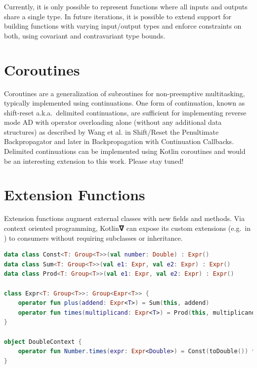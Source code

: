 \documentclass[12pt,initial,twoside,maitrise]{dms}
\numberwithin{equation}{section}
\numberwithin{table}{chapter}
\numberwithin{figure}{chapter}
\begin{document}
Currently, it is only possible to represent functions where all inputs and outputs share a single type. In future iterations, it is possible to extend support for building functions with varying input/output types and enforce constraints on both, using covariant and contravariant type bounds.

\section{Coroutines}

Coroutines are a generalization of subroutines for non-preemptive multitasking, typically implemented using continuations. One form of continuation, known as shift-reset a.k.a.\ delimited continuations, are sufficient for implementing reverse mode AD with operator overloading alone (without any additional data structures) as described by Wang et al. in Shift/Reset the Penultimate Backpropagator\cite{wang2018demystifying} and later in Backpropagation with Continuation Callbacks\cite{wang2018backpropagation}. Delimited continuations can be implemented using Kotlin coroutines and would be an interesting extension to this work. Please stay tuned!

\section{Extension Functions}

Extension functions augment external classes with new fields and methods. Via context oriented programming, Kotlin𝛁 can expose its custom extensions (e.g.\ in ) to consumers without requiring subclasses or inheritance.

\begin{lstlisting}[caption={Using extension functions we can provide numerical conversions for common data types, wrapped by a Context.}, language=Kotlin]
data class Const<T: Group<T>>(val number: Double) : Expr()
data class Sum<T: Group<T>>(val e1: Expr, val e2: Expr) : Expr()
data class Prod<T: Group<T>>(val e1: Expr, val e2: Expr) : Expr()

class Expr<T: Group<T>>: Group<Expr<T>> {
    operator fun plus(addend: Expr<T>) = Sum(this, addend)
    operator fun times(multiplicand: Expr<T>) = Prod(this, multiplicand)
}

object DoubleContext {
    operator fun Number.times(expr: Expr<Double>) = Const(toDouble()) * expr
}
\end{lstlisting}
\end{document}
